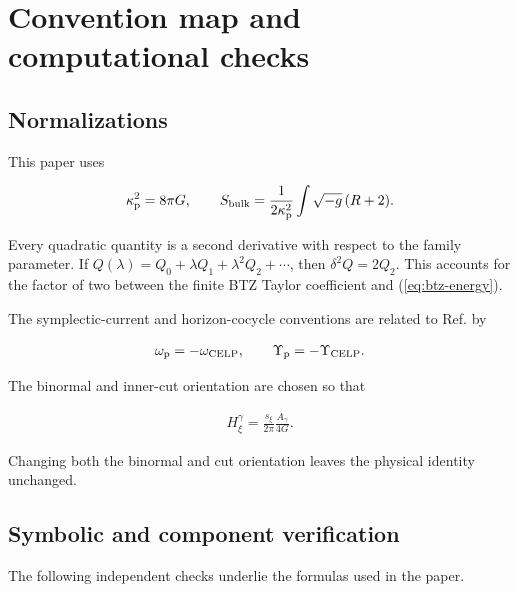 \section{Convention map and computational checks}\label{app:checks}

\subsection{Normalizations}

This paper uses

\begin{align}
\kappa_{\rm p}^{2}=8\pi G,
\qquad
S_{\rm bulk}
=\frac1{2\kappa_{\rm p}^{2}}
\int\sqrt{-g}\,(R+2).
\end{align}

Every quadratic quantity is a second derivative with respect to the family parameter. If $Q(\lambda)=Q_0+\lambda Q_1+\lambda^2Q_2+\cdots$, then $\delta^2Q=2Q_2$. This accounts for the factor of two between the finite BTZ Taylor coefficient and (\ref{eq:btz-energy}).

The symplectic-current and horizon-cocycle conventions are related to Ref. \cite{ColinEllerin:2025gravitons} by

\begin{align}
\omega_{\rm p}=-\omega_{\rm CELP},
\qquad
\Upsilon_{\rm p}=-\Upsilon_{\rm CELP}.
\end{align}

The binormal and inner-cut orientation are chosen so that

\begin{align}
H_\xi^\gamma
=\frac{s_\xi}{2\pi}\frac{A_\gamma}{4G}.
\end{align}

Changing both the binormal and cut orientation leaves the physical identity unchanged.

\subsection{Symbolic and component verification}

The following independent checks underlie the formulas used in the paper.

